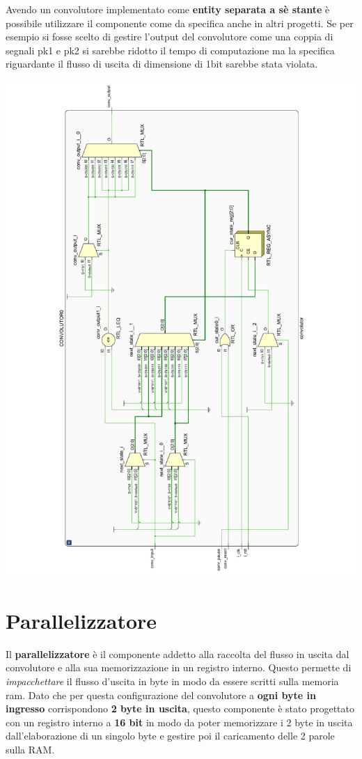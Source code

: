 \documentclass[a4paper]{report}
\begin{document}
Avendo un convolutore implementato come \textbf{entity separata a sè stante} è possibile utilizzare il componente come da specifica anche in altri progetti. Se per esempio si fosse scelto di gestire l'output del convolutore come una coppia di segnali pk1 e pk2 si sarebbe ridotto il tempo di computazione ma la specifica riguardante il flusso di uscita di dimensione di 1bit sarebbe stata violata.

\includegraphics[scale = 0.45]{schematics/convolutor.pdf}

\section{Parallelizzatore}
Il \textbf{parallelizzatore} è il componente addetto alla raccolta del flusso in uscita dal convolutore e alla sua memorizzazione in un registro interno. Questo permette di \textit{impacchettare} il flusso d'uscita in byte in modo da essere scritti sulla memoria ram. 
Dato che per questa configurazione del convolutore a \textbf{ogni byte in ingresso} corrispondono \textbf{2 byte in uscita}, questo componente è stato progettato con un registro interno a \textbf{16 bit} in modo da poter memorizzare i 2 byte in uscita dall'elaborazione di un singolo byte e gestire poi il caricamento delle 2 parole sulla RAM. 
\end{document}
